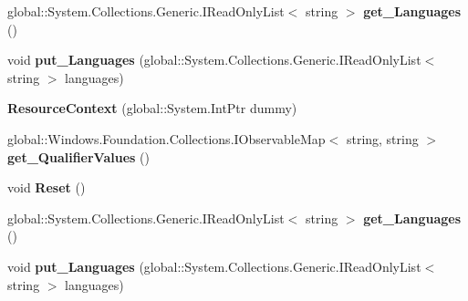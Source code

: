 \begin{DoxyCompactItemize}
global\+::\+System.\+Collections.\+Generic.\+I\+Read\+Only\+List$<$ string $>$ {\bfseries get\+\_\+\+Languages} ()
\item 
\mbox{\label{class_windows_1_1_application_model_1_1_resources_1_1_core_1_1_resource_context_aeb5ce93158d04ebbec8c22b384409285}} 
void {\bfseries put\+\_\+\+Languages} (global\+::\+System.\+Collections.\+Generic.\+I\+Read\+Only\+List$<$ string $>$ languages)
\item 
\mbox{\label{class_windows_1_1_application_model_1_1_resources_1_1_core_1_1_resource_context_a718c064119f7ea5fd82856c6423dad71}} 
{\bfseries Resource\+Context} (global\+::\+System.\+Int\+Ptr dummy)
\item 
\mbox{\label{class_windows_1_1_application_model_1_1_resources_1_1_core_1_1_resource_context_ac228527597261c45581d0c380d6339bd}} 
global\+::\+Windows.\+Foundation.\+Collections.\+I\+Observable\+Map$<$ string, string $>$ {\bfseries get\+\_\+\+Qualifier\+Values} ()
\item 
\mbox{\label{class_windows_1_1_application_model_1_1_resources_1_1_core_1_1_resource_context_a8d2f7782f2b1b6983c33b2297f40b075}} 
void {\bfseries Reset} ()
\item 
\mbox{\label{class_windows_1_1_application_model_1_1_resources_1_1_core_1_1_resource_context_a56ecf1f243ff7d36fb0a7621f3016c07}} 
global\+::\+System.\+Collections.\+Generic.\+I\+Read\+Only\+List$<$ string $>$ {\bfseries get\+\_\+\+Languages} ()
\item 
\mbox{\label{class_windows_1_1_application_model_1_1_resources_1_1_core_1_1_resource_context_aeb5ce93158d04ebbec8c22b384409285}} 
void {\bfseries put\+\_\+\+Languages} (global\+::\+System.\+Collections.\+Generic.\+I\+Read\+Only\+List$<$ string $>$ languages)
\item 
\mbox{\label{class_windows_1_1_application_model_1_1_resources_1_1_core_1_1_resource_context_a718c064119f7ea5fd82856c6423dad71}} 

\end{DoxyCompactItemize}
